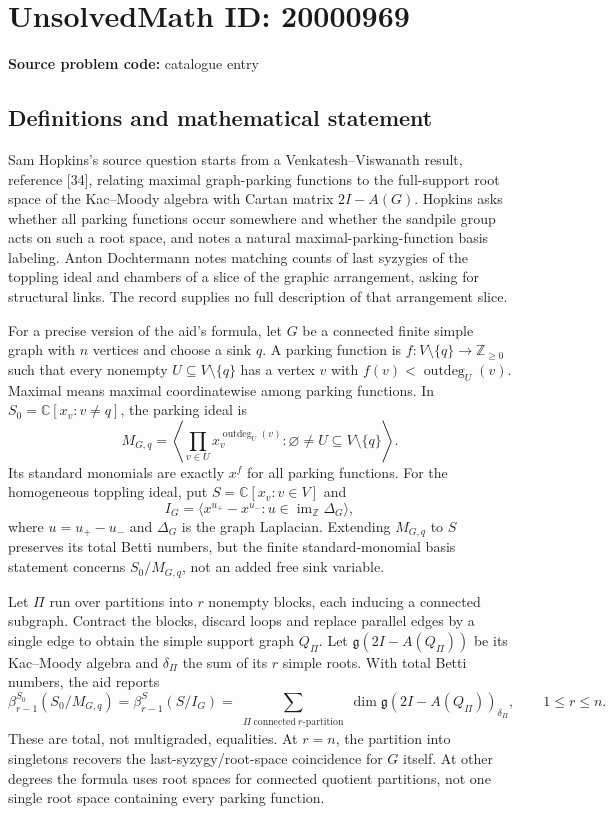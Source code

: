 \documentclass[11pt]{article}
\newcommand{\Z}{\mathbb{Z}}
\newcommand{\C}{\mathbb{C}}
\begin{document}
\section*{UnsolvedMath ID: 20000969}
\textbf{Source problem code:} catalogue entry
\subsection{Definitions and mathematical statement}
Sam Hopkins's source question starts from a Venkatesh--Viswanath result, reference [34], relating maximal graph-parking functions to the full-support root space of the Kac--Moody algebra with Cartan matrix $2I-A(G)$. Hopkins asks whether all parking functions occur somewhere and whether the sandpile group acts on such a root space, and notes a natural maximal-parking-function basis labeling. Anton Dochtermann notes matching counts of last syzygies of the toppling ideal and chambers of a slice of the graphic arrangement, asking for structural links. The record supplies no full description of that arrangement slice.

For a precise version of the aid's formula, let $G$ be a connected finite simple graph with $n$ vertices and choose a sink $q$. A parking function is $f:V\setminus\{q\}\to\Z_{\geq0}$ such that every nonempty $U\subseteq V\setminus\{q\}$ has a vertex $v$ with $f(v)<\operatorname{outdeg}_U(v)$. Maximal means maximal coordinatewise among parking functions. In $S_0=\C[x_v:v\neq q]$, the parking ideal is
\[
 M_{G,q}=\left\langle\prod_{v\in U}x_v^{\operatorname{outdeg}_U(v)}:
             \varnothing\neq U\subseteq V\setminus\{q\}\right\rangle.
\]
Its standard monomials are exactly $x^f$ for all parking functions. For the homogeneous toppling ideal, put $S=\C[x_v:v\in V]$ and
\[
 I_G=\langle x^{u_+}-x^{u_-}:u\in\operatorname{im}_{\Z}\Delta_G\rangle,
\]
where $u=u_+-u_-$ and $\Delta_G$ is the graph Laplacian. Extending $M_{G,q}$ to $S$ preserves its total Betti numbers, but the finite standard-monomial basis statement concerns $S_0/M_{G,q}$, not an added free sink variable.

Let $\Pi$ run over partitions into $r$ nonempty blocks, each inducing a connected subgraph. Contract the blocks, discard loops and replace parallel edges by a single edge to obtain the simple support graph $Q_\Pi$. Let $\mathfrak g(2I-A(Q_\Pi))$ be its Kac--Moody algebra and $\delta_\Pi$ the sum of its $r$ simple roots. With total Betti numbers, the aid reports
\[
 \beta_{r-1}^{S_0}(S_0/M_{G,q})=\beta_{r-1}^{S}(S/I_G)
 =\sum_{\substack{\Pi\ \mathrm{connected}\ r\text{-}\mathrm{partition}}}
    \dim\mathfrak g(2I-A(Q_\Pi))_{\delta_\Pi},\qquad1\leq r\leq n.
\]
These are total, not multigraded, equalities. At $r=n$, the partition into singletons recovers the last-syzygy/root-space coincidence for $G$ itself. At other degrees the formula uses root spaces for connected quotient partitions, not one single root space containing every parking function.
\end{document}
